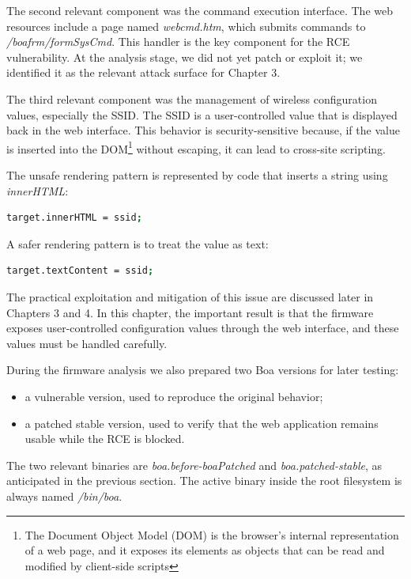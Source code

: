               The second relevant component was the command execution interface. The web resources include a page named \emph{webcmd.htm}, which submits commands to \emph{/boafrm/formSysCmd}. This handler is the key
              component for the RCE vulnerability. At the analysis stage, we did not yet patch or exploit it; we identified it as the relevant attack surface for Chapter 3.

              The third relevant component was the management of wireless configuration values, especially the SSID. The SSID is a user-controlled value that is displayed back in the web interface. This behavior is
              security-sensitive because, if the value is inserted into the DOM\footnote{The Document Object Model (DOM) is the browser's internal representation of a web page, and it exposes its elements as objects that can be read and modified by client-side scripts} without escaping, it can lead to cross-site scripting.

              The unsafe rendering pattern is represented by code that inserts a string using \emph{innerHTML}:

\begin{lstlisting}[language=bash]
target.innerHTML = ssid;
\end{lstlisting}

              A safer rendering pattern is to treat the value as text:

\begin{lstlisting}[language=bash]
target.textContent = ssid;
\end{lstlisting}


              The practical exploitation and mitigation of this issue are discussed later in Chapters 3 and 4. In this chapter, the important result is that the firmware exposes user-controlled configuration values
              through the web interface, and these values must be handled carefully.

              During the firmware analysis we also prepared two Boa versions for later testing:
              \begin{itemize}
                  \item a vulnerable version, used to reproduce the original behavior;
                  \item a patched stable version, used to verify that the web application remains usable while the RCE is blocked.
              \end{itemize}

              The two relevant binaries are \emph{boa.before-boaPatched} and \emph{boa.patched-stable}, as anticipated in the previous section. The active binary inside the root filesystem is always named \emph{/bin/boa}.

